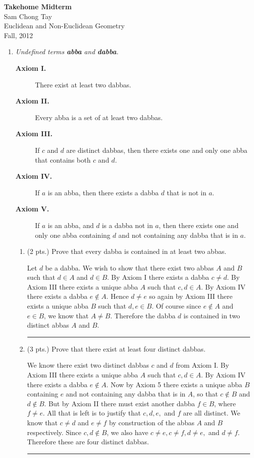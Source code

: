 \documentclass[12pt]{article}
\newenvironment{proof}{\noindent {\bf Proof:}}{\hfill
\rule{1mm}{3mm} \bigskip}
\begin{document}
\begin{center}
{\bf Takehome Midterm}\\
Sam Chong Tay\\
Euclidean and Non-Euclidean Geometry\\
Fall, 2012
\end{center}

\begin{enumerate}

\item {\em Undefined terms {\bf abba} and {\bf dabba}.}

\begin{description}
	\item[{\bf Axiom I.}] There exist at least two dabbas.
	\item[{\bf Axiom II.}] Every abba is a set of at least two dabbas.
	\item[{\bf Axiom III.}] If $c$ and $d$ are distinct dabbas, then there exists one and only one abba that contains both $c$ and $d$. 
	\item[{\bf Axiom IV.}] If $a$ is an abba, then there exists a dabba $d$ that is not in $a$.  
	\item[{\bf Axiom V.}] If $a$ is an abba, and $d$ is a dabba not in $a$, then there exists one and only one abba containing $d$ and not containing any dabba that is in $a$.  
\end{description}


\begin{enumerate}
	\item (2 pts.) Prove that every dabba is contained in at least two abbas.
	
	\begin{proof} Let $d$ be a dabba. We wish to show that there exist two abbas $A$ and $B$ such that $d\in A$ and $d\in B$. By Axiom I there exists a dabba $c\ne d$. By Axiom III there exists a unique abba $A$ such that $c, d \in A$. By Axiom IV there exists a dabba $e\notin A$. Hence $d\ne e$ so again by Axiom III there exists a unique abba $B$ such that $d, e \in B$. Of course since $e\notin A$ and $e\in B$, we know that $A\ne B$. Therefore the dabba $d$ is contained in two distinct abbas $A$ and $B$.
	\end{proof}
	
	\item (3 pts.) Prove that there exist at least four distinct dabbas.
	
		\begin{proof} We know there exist two distinct dabbas $c$ and $d$ from Axiom I. By Axiom III there exists a unique abba $A$ such that $c,d\in A$. By Axiom IV there exists a dabba $e\notin A$. Now by Axiom 5 there exists a unique abba $B$ containing $e$ and not containing any dabba that is in $A$, so that $c\notin B$ and $d\notin B$. But by Axiom II there must exist another dabba $f\in B$, where $f\ne e$. All that is left is to justify that $c,d,e,$ and $f$ are all distinct. We know that $c\ne d$ and $e\ne f$ by construction of the abbas $A$ and $B$ respectively. Since $c,d \notin B$, we also have $c\ne e, c\ne f, d\ne e, $ and $d\ne f$. Therefore these are four distinct dabbas.
	\end{proof}
	

\end{enumerate}
\end{enumerate}
\end{document}
